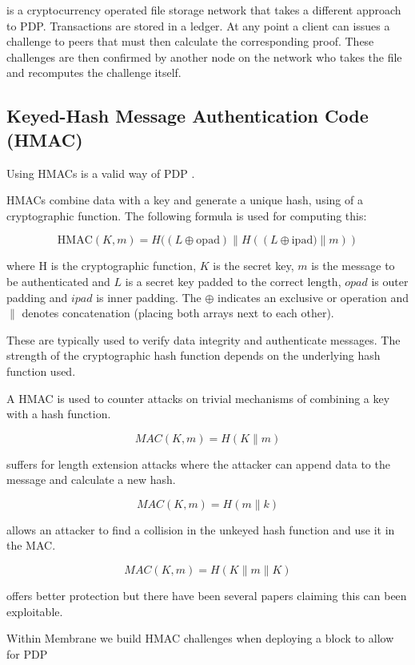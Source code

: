 \documentclass[11pt, a4paper, twoside]{report}
\begin{document}
\cite{filecoin2014filecoin} is a cryptocurrency operated file storage network that takes a different approach to PDP. Transactions are stored in a ledger. At any point a client can issues a challenge to peers that must then calculate the corresponding proof. These challenges are then confirmed by another node on the network who takes the file and recomputes the challenge itself.

\subsection{Keyed-Hash Message Authentication Code (HMAC)}

Using HMACs is a valid way of PDP \citep{ateniese2011remote}.

HMACs combine data with a key and generate a unique hash, using of a cryptographic function. \citep{krawczyk1997hmac} The following formula is used for computing this:

$$\mbox{HMAC}(K, m) = H((L \oplus \mbox{opad}) \parallel H((L \oplus \mbox{ipad)} \parallel m))$$

where H is the cryptographic function, $K$ is the secret key, $m$ is the message to be authenticated and $L$ is a secret key padded to the correct length, $opad$ is outer padding and $ipad$ is inner padding. The $\oplus$ indicates an exclusive or operation and $\parallel$ denotes concatenation (placing both arrays next to each other).

These are typically used to verify data integrity and authenticate messages. The strength of the cryptographic hash function depends on the underlying hash function used.

A HMAC is used to counter attacks on trivial mechanisms of combining a key with a hash function.

$$MAC(K, m) = H(K \parallel m)$$

suffers for length extension attacks where the attacker can append data to the message and calculate a new hash. 

$$MAC(K, m) = H(m \parallel k)$$

allows an attacker to find a collision in the unkeyed hash function and use it in the MAC. 

$$MAC(K, m) = H(K \parallel m \parallel K)$$ 

offers better protection but there have been several papers claiming this can been exploitable. \citep{bellare1996keying}

Within Membrane we build HMAC challenges when deploying a block to allow for PDP
\end{document}
